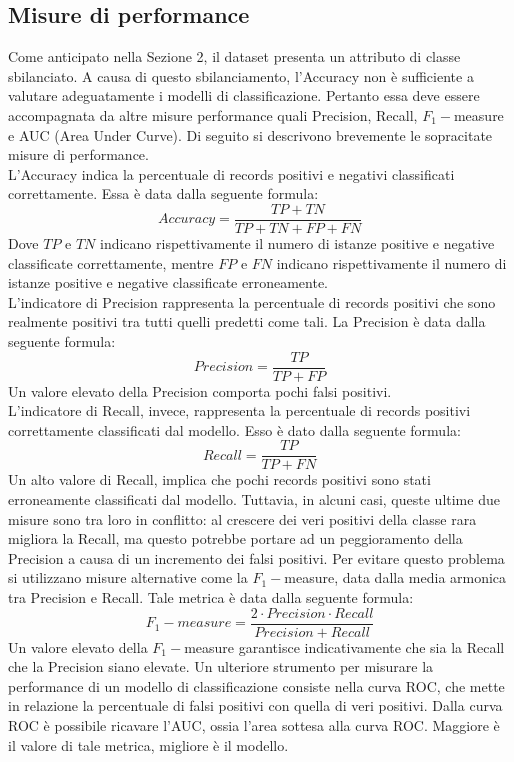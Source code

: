 \documentclass[fleqn,10pt]{SelfArx}
\begin{document}
\subsection{Misure di performance}
Come anticipato nella Sezione 2, il dataset presenta un attributo di classe sbilanciato. A causa di questo sbilanciamento, l'Accuracy non è sufficiente a valutare adeguatamente i modelli di classificazione.
Pertanto essa deve essere accompagnata da altre misure performance quali Precision, Recall, $F_1-$measure e AUC (Area Under Curve).
Di seguito si descrivono brevemente le sopracitate misure di performance.
\\
L'Accuracy indica la percentuale di records positivi e negativi classificati correttamente. Essa è data dalla seguente formula:
$$
Accuracy = \frac{TP+TN}{TP+TN+FP+FN}
$$
Dove $TP$ e $TN$ indicano rispettivamente il numero di istanze positive e negative classificate correttamente, mentre $FP$ e $FN$ indicano rispettivamente il numero di istanze positive e negative classificate erroneamente.
\\
L'indicatore di Precision rappresenta la percentuale di records positivi che sono realmente positivi tra tutti quelli predetti come tali. La Precision è data dalla seguente formula:
$$
Precision = \frac{TP}{TP+FP}
$$
Un valore elevato della Precision comporta pochi falsi positivi.
\\
L'indicatore di Recall, invece, rappresenta la percentuale di records positivi correttamente classificati dal modello. Esso è dato dalla seguente formula:
$$
Recall = \frac{TP}{TP+FN}
$$
Un alto valore di Recall, implica che pochi records positivi sono stati erroneamente classificati dal modello. Tuttavia, in alcuni casi, queste ultime due misure sono tra loro in conflitto: al crescere dei veri positivi della classe rara migliora la Recall, ma questo potrebbe portare ad un peggioramento della Precision a causa di un incremento dei falsi positivi. Per evitare questo problema si utilizzano misure alternative come la $F_1-$measure, data dalla media armonica tra Precision e Recall. Tale metrica è data dalla seguente formula: 
$$
F_1-measure = \frac{2\cdot Precision \cdot Recall}{Precision + Recall}
$$
Un valore elevato della $F_1-$measure garantisce indicativamente che sia la Recall che la Precision siano elevate.
Un ulteriore strumento per misurare la performance di un modello di classificazione consiste nella curva ROC, che mette in relazione la percentuale di falsi positivi con quella di veri positivi. Dalla curva ROC è possibile ricavare l'AUC, ossia l'area sottesa alla curva ROC. Maggiore è il valore di tale metrica, migliore è il modello.\\
\end{document}
